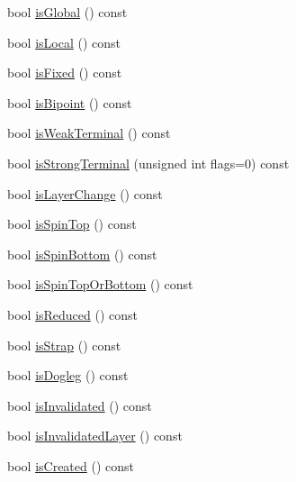 \begin{DoxyCompactItemize}
\item 
bool \mbox{\hyperlink{classKatabatic_1_1AutoSegment_a19ba379112d6b29faa45c5eefbf38500}{is\+Global}} () const
\item 
bool \mbox{\hyperlink{classKatabatic_1_1AutoSegment_add556a145a89fdbcea82346abfb873dc}{is\+Local}} () const
\item 
bool \mbox{\hyperlink{classKatabatic_1_1AutoSegment_afd7362b850709bed8b61c1aa22399f97}{is\+Fixed}} () const
\item 
bool \mbox{\hyperlink{classKatabatic_1_1AutoSegment_a72741158d19af38e84c5e9c08f91270f}{is\+Bipoint}} () const
\item 
bool \mbox{\hyperlink{classKatabatic_1_1AutoSegment_aef3a61d223be84ac336c4f7bc64884ba}{is\+Weak\+Terminal}} () const
\item 
bool \mbox{\hyperlink{classKatabatic_1_1AutoSegment_a4605c9284168f0a62fa48aa2d3ae5ee9}{is\+Strong\+Terminal}} (unsigned int flags=0) const
\item 
bool \mbox{\hyperlink{classKatabatic_1_1AutoSegment_a772596f5d5fa897822dbd0da37024735}{is\+Layer\+Change}} () const
\item 
bool \mbox{\hyperlink{classKatabatic_1_1AutoSegment_a3776b8258ab6544c9551d0714fcc75d2}{is\+Spin\+Top}} () const
\item 
bool \mbox{\hyperlink{classKatabatic_1_1AutoSegment_ab786dbdb67ea727369b1a988497c01d1}{is\+Spin\+Bottom}} () const
\item 
bool \mbox{\hyperlink{classKatabatic_1_1AutoSegment_a90d934f7275aed35f4ecb157c6950d6f}{is\+Spin\+Top\+Or\+Bottom}} () const
\item 
bool \mbox{\hyperlink{classKatabatic_1_1AutoSegment_a461c31a8d12458939b78ccecb3b8c299}{is\+Reduced}} () const
\item 
bool \mbox{\hyperlink{classKatabatic_1_1AutoSegment_a62d61c231cf404a814ae37665fa8164f}{is\+Strap}} () const
\item 
bool \mbox{\hyperlink{classKatabatic_1_1AutoSegment_a75d91371e5281dd21f60ff39ae70a3e5}{is\+Dogleg}} () const
\item 
bool \mbox{\hyperlink{classKatabatic_1_1AutoSegment_ac540608485240ff88970131ebc02c1ab}{is\+Invalidated}} () const
\item 
bool \mbox{\hyperlink{classKatabatic_1_1AutoSegment_a77b075644356f016105b3050b031a2ec}{is\+Invalidated\+Layer}} () const
\item 
bool \mbox{\hyperlink{classKatabatic_1_1AutoSegment_af7d9cf1d7581b1cab04cf38c64f0f72a}{is\+Created}} () const
\item 

\end{DoxyCompactItemize}
